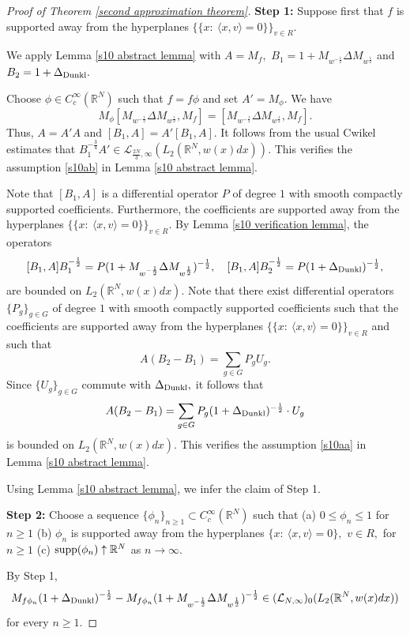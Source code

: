 \documentclass{amsart}
\begin{document}
\begin{proof}[Proof of Theorem \ref{second approximation theorem}]

{\bf Step 1:} Suppose first that $f$ is supported away from the hyperplanes $\{\{x:\ \langle x,v\rangle=0\}\}_{v\in R}.$

We apply Lemma \ref{s10 abstract lemma} with $A=M_f,$ $B_1=1+M_{w^{-\frac12}}\Delta M_{w^{\frac12}}$ and $B_2=1+\Delta_{{\rm Dunkl}}.$

Choose $\phi\in C^{\infty}_c(\mathbb{R}^N)$ such that $f=f\phi$ and set $A'=M_{\phi}.$ We have
$$M_{\phi}[M_{w^{-\frac12}}\Delta M_{w^{\frac12}},M_f]=[M_{w^{-\frac12}}\Delta M_{w^{\frac12}},M_f].$$
Thus, $A=A'A$ and $[B_1,A]=A'[B_1,A].$ It follows from the usual Cwikel estimates that $B_1^{-\frac34}A'\in\mathcal{L}_{\frac{2N}{3},\infty}(L_2(\mathbb{R}^N,w(x)dx)).$ This verifies the assumption \eqref{s10ab} in Lemma \ref{s10 abstract lemma}.

Note that $[B_1,A]$ is a differential operator $P$ of degree $1$ with smooth compactly supported coefficients. Furthermore, the coefficients are supported away from the hyperplanes $\{\{x:\ \langle x,v\rangle=0\}\}_{v\in R}.$ By Lemma \ref{s10 verification lemma}, the operators
$$[B_1,A]B_1^{-\frac12}=P(1+M_{w^{-\frac12}}\Delta M_{w^{\frac12}})^{-\frac12},\quad [B_1,A]B_2^{-\frac12}=P(1+\Delta_{{\rm Dunkl}})^{-\frac12},$$
are bounded on $L_2(\mathbb{R}^N,w(x)dx).$ Note that there exist differential operators $\{P_g\}_{g\in G}$ of degree $1$ with smooth compactly supported coefficients such that the coefficients are supported away from the hyperplanes $\{\{x:\ \langle x,v\rangle=0\}\}_{v\in R}$ and such that
$$A(B_2-B_1)=\sum_{g\in G}P_gU_g.$$
Since $\{U_g\}_{g\in G}$ commute with $\Delta_{{\rm Dunkl}},$ it follows that
$$A(B_2-B_1)=\sum_{g\in G}P_g(1+\Delta_{{\rm Dunkl}})^{-\frac12}\cdot U_g$$
is bounded on $L_2(\mathbb{R}^N,w(x)dx).$ This verifies the assumption \eqref{s10aa} in Lemma \ref{s10 abstract lemma}.

Using Lemma \ref{s10 abstract lemma}, we infer the claim of Step 1.

{\bf Step 2:} Choose a sequence $\{\phi_n\}_{n\geq1}\subset C^{\infty}_c(\mathbb{R}^N)$ such that (a) $0\leq\phi_n\leq1$ for $n\geq1$ (b) $\phi_n$ is supported away from the hyperplanes $\{x:\ \langle x,v\rangle=0\},$ $v\in R,$ for $n\geq 1$ (c) ${\rm supp}(\phi_n)\uparrow\mathbb{R}^N$ as $n\to\infty.$

By Step 1,
$$M_{f\phi_n}(1+\Delta_{{\rm Dunkl}})^{-\frac12}-M_{f\phi_n}(1+M_{w^{-\frac12}}\Delta M_{w^{\frac12}})^{-\frac12}\in (\mathcal{L}_{N,\infty})_0(L_2(\mathbb{R}^N,w(x)dx))$$
for every $n\geq1.$


\end{proof}
\end{document}
